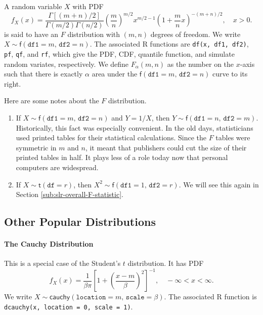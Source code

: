 \documentclass[captions=tableheading]{scrbook}
\begin{document}
A random variable \(X\) with PDF
\begin{equation}
f_{X}(x)=\frac{\Gamma[(m+n)/2]}{\Gamma(m/2)\Gamma(n/2)}\left(\frac{m}{n}\right)^{m/2}x^{m/2-1}\left(1+\frac{m}{n}x\right)^{-(m+n)/2},\quad x>0.
\end{equation}
is said to have an \(F\) distribution with \((m,n)\) degrees of freedom. We write \(X\sim\mathsf{f}(\mathtt{df1}=m,\,\mathtt{df2}=n)\). The associated \textsf{R} functions are \texttt{df(x, df1, df2)}, \texttt{pf}, \texttt{qf}, and \texttt{rf}, which give the PDF, CDF, quantile function, and simulate random variates, respectively. We define \(F_{\alpha}(m,n)\) as the number on the \(x\)-axis such that there is exactly \(\alpha\) area under the \(\mathsf{f}(\mathtt{df1}=m,\,\mathtt{df2}=n)\) curve to its right. 

\begin{rem}
Here are some notes about the \(F\) distribution.
\begin{enumerate}
\item If \(X\sim\mathsf{f}(\mathtt{df1}=m,\,\mathtt{df2}=n)\) and \(Y=1/X\), then \(Y\sim\mathsf{f}(\mathtt{df1}=n,\,\mathtt{df2}=m)\). Historically, this fact was especially convenient. In the old days, statisticians used printed tables for their statistical calculations. Since the \(F\) tables were symmetric in \(m\) and \(n\), it meant that publishers could cut the size of their printed tables in half. It plays less of a role today now that personal computers are widespread.
\item If \(X\sim\mathsf{t}(\mathtt{df}=r)\), then \(X^{2}\sim\mathsf{f}(\mathtt{df1}=1,\,\mathtt{df2}=r)\). We will see this again in Section \ref{sub:slr-overall-F-statistic}.
\end{enumerate}

\end{rem}
\subsection{Other Popular Distributions}
\label{sec-6-5-6}

\label{sub:Other-Popular-Distributions}

\paragraph*{The Cauchy Distribution}
\label{sub:The-Cauchy-Distribution}

This is a special case of the Student's \(t\) distribution. It has PDF
\begin{equation}
f_{X}(x)=\frac{1}{\beta\pi}\left[1+\left(\frac{x-m}{\beta}\right)^{2}\right]^{-1},\quad-\infty<x<\infty.
\end{equation}
We write \(X\sim\mathsf{cauchy}(\mathtt{location}=m,\,\mathtt{scale}=\beta)\). The associated \textsf{R} function is \texttt{dcauchy(x, location = 0, scale = 1)}.
\end{document}

